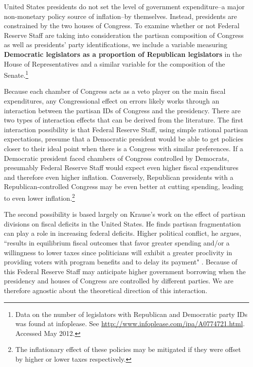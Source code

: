 \documentclass[a4paper]{article}
\begin{document}
United States presidents do not set the level of government expenditure--a major non-monetary policy source of inflation--by themselves. Instead, presidents are constrained by the two houses of Congress. To examine whether or not Federal Reserve Staff are taking into consideration the partisan composition of Congress as well as presidents' party identifications, we include a variable measuring {\bf{Democratic legislators as a proportion of Republican legislators}} in the House of Representatives and a similar variable for the composition of the Senate.\footnote{Data on the number of legislators with Republican and Democratic party IDs was found at infoplease. See {\url{http://www.infoplease.com/ipa/A0774721.html}}. Accessed May 2012.}

Because each chamber of Congress acts as a veto player on the main fiscal expenditures, any Congressional effect on errors likely works through an interaction between the partisan IDs of Congress and the presidency. There are two types of interaction effects that can be derived from the literature. The first interaction possibility is that Federal Reserve Staff, using simple rational partisan expectations, presume that a Democratic president would be able to get policies closer to their ideal point when there is a Congress with similar preferences. If a Democratic president faced chambers of Congress controlled by Democrats, presumably Federal Reserve Staff would expect even higher fiscal expenditures and therefore even higher inflation. Conversely, Republican presidents with a Republican-controlled Congress may be even better at cutting spending, leading to even lower inflation.\footnote{The inflationary effect of these policies may be mitigated if they were offset by higher or lower taxes respectively.}

The second possibility is based largely on Krause's \citeyearpar{Krause2000} work on the effect of partisan divisions on fiscal deficits in the United States. He finds partisan fragmentation can play a role in increasing federal deficits. Higher political conflict, he argues, ``results in equilibrium fiscal outcomes that favor greater spending and/or a willingness to lower taxes since politicians will exhibit a greater proclivity in providing voters with program benefits and to delay its payment" \citep[][542]{Krause2000}. Because of this Federal Reserve Staff may anticipate higher government borrowing when the presidency and houses of Congress are controlled by different parties. We are therefore agnostic about the theoretical direction of this interaction.
\end{document}
